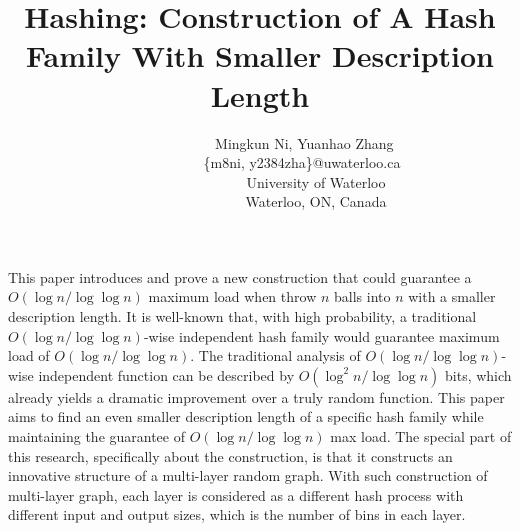 \documentclass[a4paper, english]{paper}
\renewenvironment{abstract}
 {
  \begin{center}
  \bfseries \abstractname\vspace{-.5em}\vspace{0pt}
  \end{center}
  \list{}{
    \setlength{\leftmargin}{1cm}%
    \setlength{\rightmargin}{\leftmargin}%
  }%
  \item\relax}
 {\endlist}
\begin{document}
\selectfont

	\title{Hashing: Construction of A Hash Family With Smaller Description Length}
	\author{$\qquad$$\qquad$$\qquad$ Mingkun Ni, Yuanhao Zhang\\
		$\qquad$$\qquad$$\qquad$\{m8ni, y2384zha\}@uwaterloo.ca\\
		 $\qquad$$\qquad$$\qquad$$\qquad$University of Waterloo\\
		$\qquad$$\qquad$$\qquad$$\qquad$Waterloo, ON, Canada\\
	}
	\maketitle
	
	\vspace{0.3cm}
	\begin{abstract}
	This paper introduces and prove a new construction that could guarantee a $O(\log n/\log\log n)$ maximum load when throw $n$ balls into $n$ with a smaller description length. It is well-known that, with high probability, a traditional $O(\log n/\log\log n)$-wise independent hash family would guarantee maximum load of $O(\log n/\log\log n)$. The traditional analysis of $O(\log n/\log\log n)$-wise independent function can be described by $O(\log^2 n/\log\log n)$ bits, which already yields a dramatic improvement over a truly random function. This paper aims to find an even smaller description length of a specific hash family while maintaining the guarantee of $O(\log n/\log\log n)$ max load. The special part of this research, specifically about the construction, is that it constructs an innovative structure of a multi-layer random graph. With such construction of multi-layer graph, each layer is considered as a different hash process with different input and output sizes, which is the number of bins in each layer.
	\end{abstract}
	\vspace{0.3cm}
\end{document}
